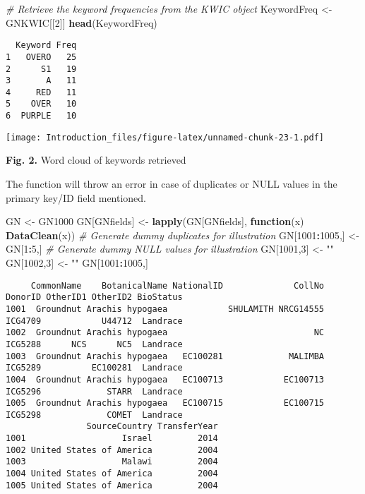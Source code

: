 \documentclass[
]{article}
\newenvironment{Shaded}{\begin{snugshade}}{\end{snugshade}}
\newcommand{\CommentTok}[1]{\textcolor[rgb]{0.56,0.35,0.01}{\textit{#1}}}
\newcommand{\ControlFlowTok}[1]{\textcolor[rgb]{0.13,0.29,0.53}{\textbf{#1}}}
\newcommand{\DecValTok}[1]{\textcolor[rgb]{0.00,0.00,0.81}{#1}}
\newcommand{\KeywordTok}[1]{\textcolor[rgb]{0.13,0.29,0.53}{\textbf{#1}}}
\newcommand{\NormalTok}[1]{#1}
\newcommand{\OperatorTok}[1]{\textcolor[rgb]{0.81,0.36,0.00}{\textbf{#1}}}
\newcommand{\StringTok}[1]{\textcolor[rgb]{0.31,0.60,0.02}{#1}}
\begin{document}
\begin{Shaded}
\begin{Highlighting}[]
\CommentTok{# Retrieve the keyword frequencies from the KWIC object}
\NormalTok{KeywordFreq <-}\StringTok{ }\NormalTok{GNKWIC[[}\DecValTok{2}\NormalTok{]]}
\KeywordTok{head}\NormalTok{(KeywordFreq)}
\end{Highlighting}
\end{Shaded}

\begin{verbatim}
  Keyword Freq
1   OVERO   25
2      S1   19
3       A   11
4     RED   11
5    OVER   10
6  PURPLE   10
\end{verbatim}

\texttt{[image: Introduction\_files/figure-latex/unnamed-chunk-23-1.pdf]}

\textbf{Fig. 2.} Word cloud of keywords retrieved

The function will throw an error in case of duplicates or NULL values in
the primary key/ID field mentioned.

\begin{Shaded}
\begin{Highlighting}[]
\NormalTok{GN <-}\StringTok{ }\NormalTok{GN1000}
\NormalTok{GN[GNfields] <-}\StringTok{ }\KeywordTok{lapply}\NormalTok{(GN[GNfields], }\ControlFlowTok{function}\NormalTok{(x) }\KeywordTok{DataClean}\NormalTok{(x))}
\CommentTok{# Generate dummy duplicates for illustration}
\NormalTok{GN[}\DecValTok{1001}\OperatorTok{:}\DecValTok{1005}\NormalTok{,] <-}\StringTok{ }\NormalTok{GN[}\DecValTok{1}\OperatorTok{:}\DecValTok{5}\NormalTok{,]}
\CommentTok{# Generate dummy NULL values for illustration}
\NormalTok{GN[}\DecValTok{1001}\NormalTok{,}\DecValTok{3}\NormalTok{] <-}\StringTok{ ""}
\NormalTok{GN[}\DecValTok{1002}\NormalTok{,}\DecValTok{3}\NormalTok{] <-}\StringTok{ ""}
\NormalTok{GN[}\DecValTok{1001}\OperatorTok{:}\DecValTok{1005}\NormalTok{,]}
\end{Highlighting}
\end{Shaded}

\begin{verbatim}
     CommonName    BotanicalName NationalID              CollNo DonorID OtherID1 OtherID2 BioStatus
1001  Groundnut Arachis hypogaea            SHULAMITH NRCG14555 ICG4709            U44712  Landrace
1002  Groundnut Arachis hypogaea                             NC ICG5288      NCS      NC5  Landrace
1003  Groundnut Arachis hypogaea   EC100281             MALIMBA ICG5289          EC100281  Landrace
1004  Groundnut Arachis hypogaea   EC100713            EC100713 ICG5296             STARR  Landrace
1005  Groundnut Arachis hypogaea   EC100715            EC100715 ICG5298             COMET  Landrace
                SourceCountry TransferYear
1001                   Israel         2014
1002 United States of America         2004
1003                   Malawi         2004
1004 United States of America         2004
1005 United States of America         2004
\end{verbatim}
\end{document}
